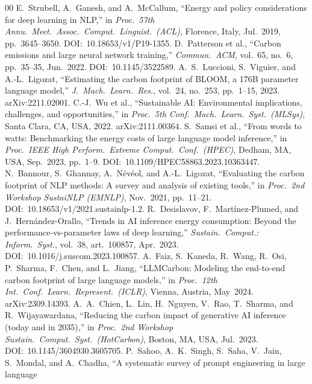 \documentclass[conference]{IEEEtran}
\begin{document}
\begin{thebibliography}{00}
E.~Strubell, A.~Ganesh, and A.~McCallum,
``Energy and policy considerations for deep learning in NLP,''
in \textit{Proc.\ 57th Annu.\ Meet.\ Assoc.\ Comput.\ Linguist.\ (ACL)},
Florence, Italy, Jul.~2019, pp.~3645--3650.
DOI:~10.18653/v1/P19-1355.
D.~Patterson et al.,
``Carbon emissions and large neural network training,''
\textit{Commun.\ ACM}, vol.~65, no.~6, pp.~35--35, Jun.~2022.
DOI:~10.1145/3522589.
A.~S.~Luccioni, S.~Viguier, and A.-L.~Ligozat,
``Estimating the carbon footprint of BLOOM, a 176B parameter
language model,''
\textit{J.~Mach.\ Learn.\ Res.}, vol.~24, no.~253,
pp.~1--15, 2023.
arXiv:2211.02001.
C.-J.~Wu et al.,
``Sustainable AI: Environmental implications, challenges,
and opportunities,''
in \textit{Proc.\ 5th Conf.\ Mach.\ Learn.\ Syst.\ (MLSys)},
Santa Clara, CA, USA, 2022.
arXiv:2111.00364.
S.~Samsi et al.,
``From words to watts: Benchmarking the energy costs of large
language model inference,''
in \textit{Proc.\ IEEE High Perform.\ Extreme Comput.\ Conf.\
(HPEC)}, Dedham, MA, USA, Sep.~2023, pp.~1--9.
DOI:~10.1109/HPEC58863.2023.10363447.
N.~Bannour, S.~Ghannay, A.~N\'ev\'eol, and A.-L.~Ligozat,
``Evaluating the carbon footprint of NLP methods: A survey
and analysis of existing tools,''
in \textit{Proc.\ 2nd Workshop SustaiNLP (EMNLP)},
Nov.~2021, pp.~11--21.
DOI:~10.18653/v1/2021.sustainlp-1.2.
R.~Desislavov, F.~Mart\'inez-Plumed, and J.~Hern\'andez-Orallo,
``Trends in AI inference energy consumption: Beyond the
performance-vs-parameter laws of deep learning,''
\textit{Sustain.\ Comput.: Inform.\ Syst.}, vol.~38,
art.~100857, Apr.~2023.
DOI:~10.1016/j.suscom.2023.100857.
A.~Faiz, S.~Kaneda, R.~Wang, R.~Osi, P.~Sharma, F.~Chen, and
L.~Jiang,
``LLMCarbon: Modeling the end-to-end carbon footprint of large
language models,''
in \textit{Proc.\ 12th Int.\ Conf.\ Learn.\ Represent.\ (ICLR)},
Vienna, Austria, May~2024.
arXiv:2309.14393.
A.~A.~Chien, L.~Lin, H.~Nguyen, V.~Rao, T.~Sharma, and
R.~Wijayawardana,
``Reducing the carbon impact of generative AI inference (today
and in 2035),''
in \textit{Proc.\ 2nd Workshop Sustain.\ Comput.\ Syst.\
(HotCarbon)}, Boston, MA, USA, Jul.~2023.
DOI:~10.1145/3604930.3605705.
\bibitem{sahoo2024systematic}
P.~Sahoo, A.~K.~Singh, S.~Saha, V.~Jain, S.~Mondal, and
A.~Chadha,
``A systematic survey of prompt engineering in large language

\end{thebibliography}
\end{document}
